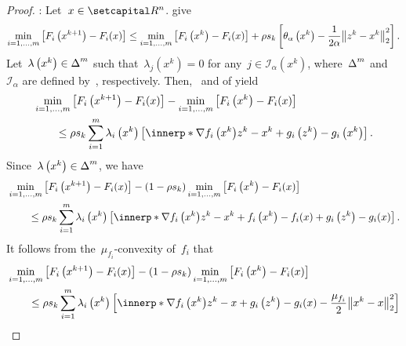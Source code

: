 \documentclass[../../main]{subfiles}
\begin{document}
\begin{proof}
    :
    Let~$x \in \setR^n$.
     give
    \begin{equation}
        \min_{i = 1, \dots, m} \left[F_i\left(x^{k + 1}\right) - F_i(x)\right] \le \min_{i = 1, \dots, m} \left[F_i\left(x^k\right) - F_i(x)\right] + \rho s_k \left[ \theta_\alpha\left(x^k\right) - \frac{1}{2 \alpha} \norm*{z^k - x^k}_2^2 \right]
        .\end{equation}
    Let~$\lambda\left(x^k\right) \in \operatorname{\Delta}^m$ such that~$\lambda_j\left(x^k\right) = 0$ for any~$j \in \mathcal{I}_\alpha\left(x^k\right)$, where~$\operatorname{\Delta}^m$ and~$\mathcal{I}_\alpha$ are defined by~, respectively.
    Then,~ and  of  yield
    \begin{align}
        \MoveEqLeft \min_{i = 1, \dots, m} \left[F_i\left(x^{k + 1}\right) - F_i(x)\right] - \min_{i = 1, \dots, m} \left[F_i\left(x^k\right) - F_i(x)\right]                 \\
         & \le \rho s_k \sum_{i = 1}^{m} \lambda_i\left(x^k\right) \left[ \innerp*{\nabla f_i\left(x^k\right)}{z^k - x^k} + g_i\left(z^k\right) - g_i\left(x^k\right) \right]
        .\end{align}
    Since~$\lambda\left(x^k\right) \in \operatorname{\Delta}^m$, we have
    \begin{align}
        \MoveEqLeft \min_{i = 1, \dots, m} \left[F_i\left(x^{k + 1}\right) - F_i(x)\right] - (1 - \rho s_k) \min_{i = 1, \dots, m}\left[F_i\left(x^k\right) - F_i(x)\right]                     \\
         & \le \rho s_k \sum_{i = 1}^{m} \lambda_i\left(x^k\right) \left[ \innerp*{\nabla f_i\left(x^k\right)}{z^k - x^k} + f_i\left(x^k\right) - f_i(x) + g_i\left(z^k\right) - g_i(x) \right]
        .\end{align}
    It follows from the~$\mu_{f_i}$-convexity of~$f_i$ that
    \begin{align}
        \MoveEqLeft \min_{i = 1, \dots, m} \left[F_i\left(x^{k + 1}\right) - F_i(x)\right] - (1 - \rho s_k) \min_{i = 1, \dots, m}\left[F_i\left(x^k\right) - F_i(x)\right]                                   \\
         & \le \rho s_k \sum_{i = 1}^{m} \lambda_i\left(x^k\right) \left[ \innerp*{\nabla f_i\left(x^k\right)}{z^k - x} + g_i\left(z^k\right) - g_i(x) - \frac{\mu_{f_i}}{2} \norm*{x^k - x}_2^2 \right]      \\

\end{align}
\end{proof}
\end{document}
